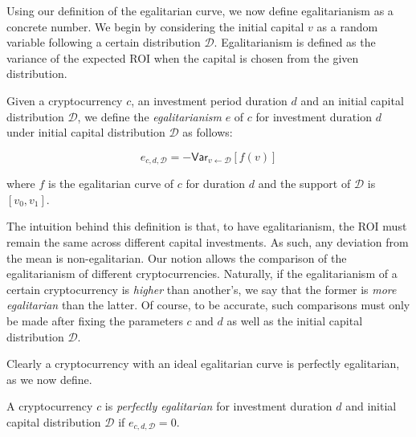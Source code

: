 
Using our definition of the egalitarian curve, we now define egalitarianism as
a concrete number. We begin by considering the initial capital $v$ as a random
variable following a certain distribution $\mathcal{D}$. Egalitarianism is
defined as the variance of the expected ROI when the capital is chosen from the
given distribution.

\begin{definition}[Egalitarianism]
  Given a cryptocurrency $c$, an investment period duration $d$ and an initial
  capital distribution $\mathcal{D}$, we define the \emph{egalitarianism} $e$ of $c$
  for investment duration $d$ under initial capital distribution $\mathcal{D}$
  as follows:

  \[
    e_{c,d,\mathcal{D}} = -\textsf{Var}_{v \gets \mathcal{D}}[f(v)]
  \]

  where $f$ is the egalitarian curve of $c$ for duration $d$ and the support of
  $\mathcal{D}$ is $[v_0, v_1]$.
\end{definition}

The intuition behind this definition is that, to have egalitarianism, the ROI
must remain the same across different capital investments. As such, any
deviation from the mean is non-egalitarian. Our notion allows the comparison of
the egalitarianism of different cryptocurrencies. Naturally, if the
egalitarianism of a certain cryptocurrency is \emph{higher} than another's, we
say that the former is \emph{more egalitarian} than the latter. Of course, to be
accurate, such comparisons must only be made after fixing the parameters $c$
and $d$ as well as the initial capital distribution $\mathcal{D}$.

Clearly a cryptocurrency with an ideal egalitarian curve is perfectly
egalitarian, as we now define.

\begin{definition}
  A cryptocurrency $c$ is \emph{perfectly egalitarian} for investment duration
  $d$ and initial capital distribution $\mathcal{D}$ if
  $e_{c,d,\mathcal{D}} = 0$.
\end{definition}
